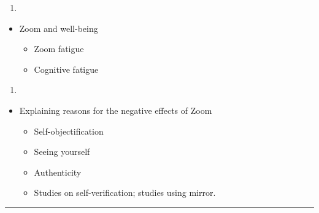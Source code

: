 \documentclass[
  english,
  man]{apa7}
\providecommand{\tightlist}{%
  \setlength{\itemsep}{0pt}\setlength{\parskip}{0pt}}
\begin{document}
\begin{enumerate}
\def\labelenumi{\arabic{enumi})}
\setcounter{enumi}{2}
\tightlist
\item
\end{enumerate}

\begin{itemize}
\tightlist
\item
  Zoom and well-being

  \begin{itemize}
  \tightlist
  \item
    Zoom fatigue
  \item
    Cognitive fatigue
  \end{itemize}
\end{itemize}

\begin{enumerate}
\def\labelenumi{\arabic{enumi})}
\setcounter{enumi}{3}
\tightlist
\item
\end{enumerate}

\begin{itemize}
\tightlist
\item
  Explaining reasons for the negative effects of Zoom

  \begin{itemize}
  \tightlist
  \item
    Self-objectification
  \item
    Seeing yourself
  \item
    Authenticity
  \item
    Studies on self-verification; studies using mirror.
  \end{itemize}
\end{itemize}

\begin{center}\rule{0.5\linewidth}{0.5pt}\end{center}
\end{document}
